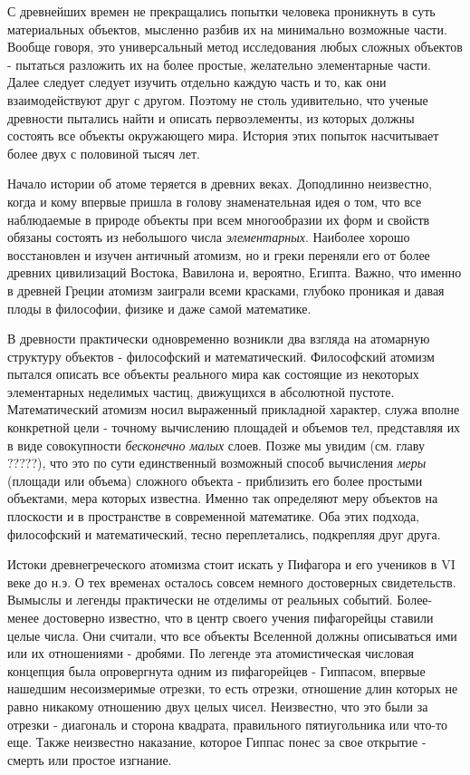 С древнейших времен не прекращались попытки человека проникнуть в суть материальных объектов, мысленно разбив их на минимально возможные части.
Вообще говоря, это универсальный метод исследования любых сложных объектов - пытаться разложить их на более простые, желательно элементарные части. 
Далее следует следует изучить отдельно каждую часть и то, как они взаимодействуют друг с другом.
Поэтому не столь удивительно, что ученые древности пытались найти и описать первоэлементы, из которых должны состоять все объекты окружающего мира.
История этих попыток насчитывает более двух с половиной тысяч лет.

Начало истории об атоме теряется в древних веках.
Доподлинно неизвестно, когда и кому впервые пришла в голову знаменательная идея о том, что все наблюдаемые в природе объекты при всем многообразии их форм и свойств обязаны состоять из небольшого числа \textit{элементарных}.
Наиболее хорошо восстановлен и изучен античный атомизм, но и греки переняли его от более древних цивилизаций Востока, Вавилона и, вероятно, Египта.
Важно, что именно в древней Греции атомизм заиграли всеми красками, глубоко проникая и давая плоды в философии, физике и даже самой математике.

В древности практически одновременно возникли два взгляда на атомарную структуру объектов - философский и математический.
Философский атомизм пытался описать все объекты реального мира как состоящие из некоторых элементарных неделимых частиц, движущихся в абсолютной пустоте.
Математический атомизм носил выраженный прикладной характер, служа вполне конкретной цели - точному вычислению площадей и объемов тел, представляя их в виде совокупности \textit{бесконечно малых} слоев.
Позже мы увидим (см. главу ?????), что это по сути единственный возможный способ вычисления \textit{меры} (площади или объема) сложного объекта - приблизить его более простыми объектами, мера которых известна.
Именно так определяют меру объектов на плоскости и в пространстве в современной математике.
Оба этих подхода, философский и математический, тесно переплетались, подкрепляя друг друга.

Истоки древнегреческого атомизма стоит искать у Пифагора и его учеников в VI веке до н.э. 
О тех временах осталось совсем немного достоверных свидетельств.
Вымыслы и легенды практически не отделимы от реальных событий.
Более-менее достоверно известно, что в центр своего учения пифагорейцы ставили целые числа.
Они считали, что все объекты Вселенной должны описываться ими или их отношениями - дробями.
По легенде эта атомистическая числовая концепция была опровергнута одним из пифагорейцев - Гиппасом, впервые нашедшим несоизмеримые отрезки, то есть отрезки, отношение длин которых не равно никакому отношению двух целых чисел.
Неизвестно, что это были за отрезки - диагональ и сторона квадрата, правильного пятиугольника или что-то еще.
Также неизвестно наказание, которое Гиппас понес за свое открытие - смерть или простое изгнание.   

